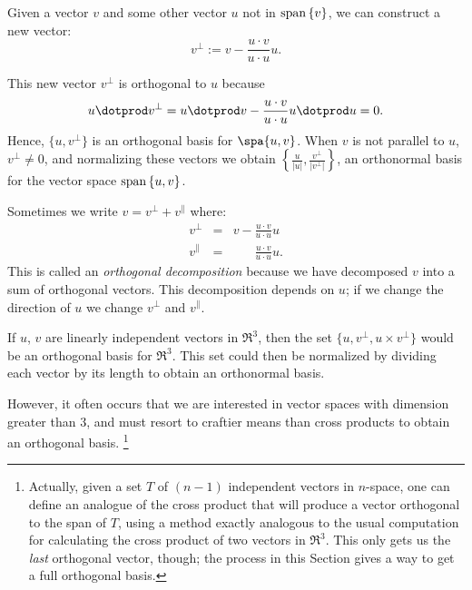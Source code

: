 
\chapter{\gramSchmidtTitle}\label{gramschmidt}


Given a vector $v$ and some other vector $u$ not in  $ {\rm span}\, \{v\} $, we can construct a new vector: 
\[
v^\perp:=v-\frac{u\cdot v}{u\cdot u}u.
\]
\begin{center}

\end{center}
This new vector $v^\perp$ is orthogonal to $u$ because 
\[
u\dotprod v^\perp = u\dotprod v - \frac{u\cdot v}{u\cdot u}u\dotprod u = 0.
\]
Hence, $\{u, v^\perp\}$ is an orthogonal basis for $\spa \{u,v\}$.  When $v$ is not parallel to $u$, $v^\perp \neq 0$, and normalizing these vectors we obtain $\left\{\frac{u}{|u|}, \frac{v^\perp}{|v^\perp|} \right\}$, an orthonormal basis for the vector space ${\rm span}\, \{u,v\}$.

Sometimes we write $v = v^\perp + v^\parallel$ where:
\begin{eqnarray*}
v^\perp &=& v-\frac{u\cdot v}{u\cdot u}u \\
v^\parallel &=& \phantom{v-}\frac{u\cdot v}{u\cdot u}u.
\end{eqnarray*}
This is called an \emph{orthogonal decomposition} because we have decomposed $v$ into a sum of orthogonal vectors.  This decomposition depends on $u$; if we change the direction of $u$ we change $v^\perp$ and $v^\parallel$.

If $u$, $v$ are linearly independent vectors in $\Re^3$, then the set $\{u, v^\perp, u\times v^\perp \}$ would be an orthogonal basis for $\Re^3$.  This set could then be normalized by dividing each vector by its length to obtain an orthonormal basis.

However, it often occurs that we are interested in vector spaces with dimension greater than $3$, and must resort to craftier means than cross products to obtain an orthogonal basis.
\footnote{Actually, given a set $T$ of $(n-1)$ independent vectors in $n$-space, one can define an analogue of the cross product that will produce a vector orthogonal to the span of $T$, using a method exactly analogous to the usual computation for calculating the cross product of two vectors in $\Re^3$.  This only gets us the \emph{last} orthogonal vector, though; the process in this Section gives a way to get a full orthogonal basis.}

